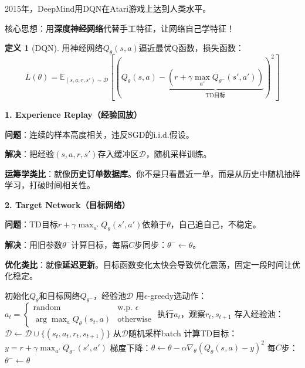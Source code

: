 \documentclass[11pt,a4paper]{article}
\theoremstyle{definition}
\newtheorem{definition}{定义}[section]
\begin{document}
\begin{plainwords}[DQN的革命性]
2015年，DeepMind用DQN在Atari游戏上达到人类水平。

核心思想：用\textbf{深度神经网络}代替手工特征，让网络自己学特征！
\end{plainwords}

\begin{definition}[DQN]
用神经网络$Q_\theta(s,a)$逼近最优Q函数，损失函数：
\[
L(\theta) = \mathbb{E}_{(s,a,r,s') \sim \mathcal{D}}\left[\left(Q_\theta(s,a) - \underbrace{(r + \gamma \max_{a'} Q_{\theta^-}(s', a'))}_{\text{TD目标}}\right)^2\right]
\]
\end{definition}

\begin{keypoint}[DQN的两个关键技巧]
\textbf{1. Experience Replay（经验回放）}

\textbf{问题}：连续的样本高度相关，违反SGD的i.i.d.假设。

\textbf{解决}：把经验$(s,a,r,s')$存入缓冲区$\mathcal{D}$，随机采样训练。

\textbf{运筹学类比}：就像\textbf{历史订单数据库}。你不是只看最近一单，而是从历史中随机抽样学习，打破时间相关性。

\textbf{2. Target Network（目标网络）}

\textbf{问题}：TD目标$r + \gamma \max_{a'} Q_\theta(s', a')$依赖于$\theta$，自己追自己，不稳定。

\textbf{解决}：用旧参数$\theta^-$计算目标，每隔$C$步同步：$\theta^- \leftarrow \theta$。

\textbf{优化类比}：就像\textbf{延迟更新}。目标函数变化太快会导致优化震荡，固定一段时间让优化稳定。
\end{keypoint}

\begin{algorithm}[H]
\caption{DQN算法}
\begin{algorithmic}[1]
\State 初始化$Q_\theta$和目标网络$Q_{\theta^-}$，经验池$\mathcal{D}$
        \State 用$\epsilon$-greedy选动作：$a_t = \begin{cases} \text{random} & \text{w.p. } \epsilon \\ \arg\max_a Q_\theta(s_t, a) & \text{otherwise} \end{cases}$
        \State 执行$a_t$，观察$r_t, s_{t+1}$
        \State 存入经验池：$\mathcal{D} \leftarrow \mathcal{D} \cup \{(s_t, a_t, r_t, s_{t+1})\}$
        \State 从$\mathcal{D}$随机采样batch
        \State 计算TD目标：$y = r + \gamma \max_{a'} Q_{\theta^-}(s', a')$
        \State 梯度下降：$\theta \leftarrow \theta - \alpha \nabla_\theta (Q_\theta(s,a) - y)^2$
        \State 每$C$步：$\theta^- \leftarrow \theta$
    \EndFor
\EndFor
\end{algorithmic}
\end{algorithm}
\end{document}

